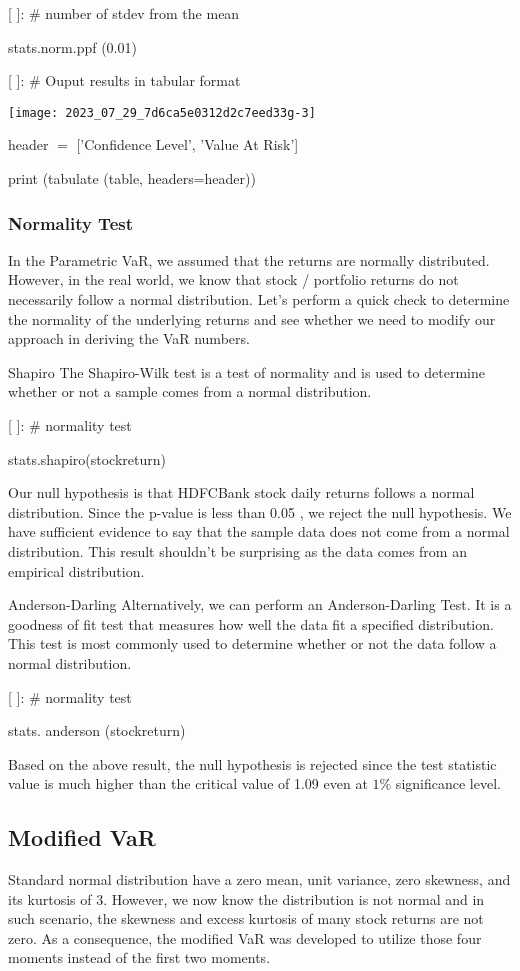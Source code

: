 \documentclass[10pt]{article}
\begin{document}
[ ]: \# number of stdev from the mean

stats.norm.ppf (0.01)

[ ]: \# Ouput results in tabular format

\begin{center}
\texttt{[image: 2023\_07\_29\_7d6ca5e0312d2c7eed33g-3]}
\end{center}

header $=$ ['Confidence Level', 'Value At Risk']

print (tabulate (table, headers=header))

\subsubsection*{Normality Test}
In the Parametric VaR, we assumed that the returns are normally distributed. However, in the real world, we know that stock / portfolio returns do not necessarily follow a normal distribution. Let's perform a quick check to determine the normality of the underlying returns and see whether we need to modify our approach in deriving the VaR numbers.

Shapiro The Shapiro-Wilk test is a test of normality and is used to determine whether or not a sample comes from a normal distribution.

[ ]: \# normality test

stats.shapiro(stockreturn)

Our null hypothesis is that HDFCBank stock daily returns follows a normal distribution. Since the p-value is less than 0.05 , we reject the null hypothesis. We have sufficient evidence to say that the sample data does not come from a normal distribution. This result shouldn't be surprising as the data comes from an empirical distribution.

Anderson-Darling Alternatively, we can perform an Anderson-Darling Test. It is a goodness of fit test that measures how well the data fit a specified distribution. This test is most commonly used to determine whether or not the data follow a normal distribution.

[ ]: \# normality test

stats. anderson (stockreturn)

Based on the above result, the null hypothesis is rejected since the test statistic value is much higher than the critical value of 1.09 even at $1 \%$ significance level.

\subsection*{Modified VaR}
Standard normal distribution have a zero mean, unit variance, zero skewness, and its kurtosis of 3. However, we now know the distribution is not normal and in such scenario, the skewness and excess kurtosis of many stock returns are not zero. As a consequence, the modified VaR was developed to utilize those four moments instead of the first two moments.
\end{document}
